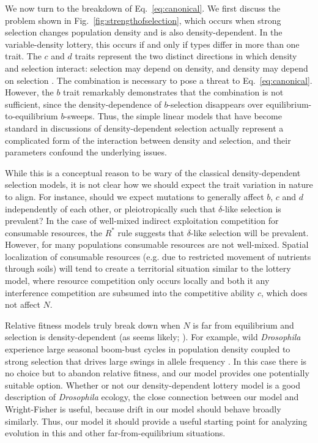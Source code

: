 \documentclass[12pt]{article}
\begin{document}
We now turn to the breakdown of Eq.~\eqref{eq:canonical}. We first discuss the problem shown in Fig.~\ref{fig:strengthofselection}, which occurs when strong selection changes population density and is also density-dependent. In the variable-density lottery, this occurs if and only if types differ in more than one trait. The $c$ and $d$ traits represent the two distinct directions in which density and selection interact: selection may depend on density, and density may depend on selection \citep{prout_1980}. The combination is necessary to pose a threat to Eq.~\eqref{eq:canonical}. However, the $b$ trait remarkably demonstrates that the combination is not sufficient, since the density-dependence of $b$-selection disappears over equilibrium-to-equilibrium $b$-sweeps. Thus, the simple linear models that have become standard in discussions of density-dependent selection \citep{roughgarden_1979,christiansen_2004,mallet_2012,travis_2013} actually represent a complicated form of the interaction between density and selection, and their parameters confound the underlying issues. 

While this is a conceptual reason to be wary of the classical density-dependent selection models, it is not clear how we should expect the trait variation in nature to align. For instance, should we expect mutations to generally affect $b$, $c$ and $d$ independently of each other, or pleiotropically such that $\delta$-like selection is prevalent? In the case of well-mixed indirect exploitation competition for consumable resources, the $R^*$ rule  suggests that $\delta$-like selection will be prevalent. However, for many populations consumable resources are not well-mixed. Spatial localization of consumable resources (e.g. due to restricted movement of  nutrients through soils) will tend to create a territorial situation similar to the lottery model, where resource competition only occurs locally and both it any interference competition are subsumed into the competitive ability $c$, which does not affect $N$. 

Relative fitness models truly break down when $N$ is far from equilibrium and selection is density-dependent (as seems likely; \citealt{travis_2013}). For example, wild \textit{Drosophila} experience large seasonal boom-bust cycles in population density coupled to strong selection that drives large swings in allele frequency \citep{bergland_14}. In this case there is no choice but to abandon relative fitness, and our model provides one potentially suitable option. Whether or not our density-dependent lottery model is a good description of \textit{Drosophila} ecology, the close connection between our model and Wright-Fisher is useful, because drift in our model should behave broadly similarly. Thus, our model it should provide a useful starting point for analyzing evolution in this and other far-from-equilibrium situations. 
\end{document}
